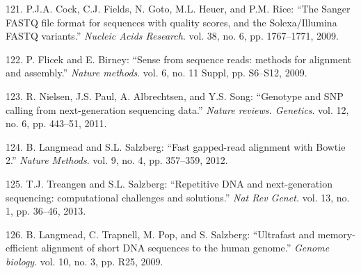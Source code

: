 \documentclass[12pt,twoside]{reedthesis}
\theoremstyle{definition}
\theoremstyle{definition}
\theoremstyle{remark}
\begin{document}
  \hypertarget{ref-Cock2009}{}
  121. P.J.A. Cock, C.J. Fields, N. Goto, M.L. Heuer, and P.M. Rice: ``The
  Sanger FASTQ file format for sequences with quality scores, and the
  Solexa/Illumina FASTQ variants.'' \emph{Nucleic Acids Research}. vol.
  38, no. 6, pp. 1767--1771, 2009.
  
  \hypertarget{ref-Flicek2009}{}
  122. P. Flicek and E. Birney: ``Sense from sequence reads: methods for
  alignment and assembly.'' \emph{Nature methods}. vol. 6, no. 11 Suppl,
  pp. S6--S12, 2009.
  
  \hypertarget{ref-Nielsen2011}{}
  123. R. Nielsen, J.S. Paul, A. Albrechtsen, and Y.S. Song: ``Genotype
  and SNP calling from next-generation sequencing data.'' \emph{Nature
  reviews. Genetics}. vol. 12, no. 6, pp. 443--51, 2011.
  
  \hypertarget{ref-Langmead2012}{}
  124. B. Langmead and S.L. Salzberg: ``Fast gapped-read alignment with
  Bowtie 2.'' \emph{Nature Methods}. vol. 9, no. 4, pp. 357--359, 2012.
  
  \hypertarget{ref-Treangen2013}{}
  125. T.J. Treangen and S.L. Salzberg: ``Repetitive DNA and
  next-generation sequencing: computational challenges and solutions.''
  \emph{Nat Rev Genet.} vol. 13, no. 1, pp. 36--46, 2013.
  
  \hypertarget{ref-Langmead2009}{}
  126. B. Langmead, C. Trapnell, M. Pop, and S. Salzberg: ``Ultrafast and
  memory-efficient alignment of short DNA sequences to the human genome.''
  \emph{Genome biology}. vol. 10, no. 3, pp. R25, 2009.
  
\end{document}
